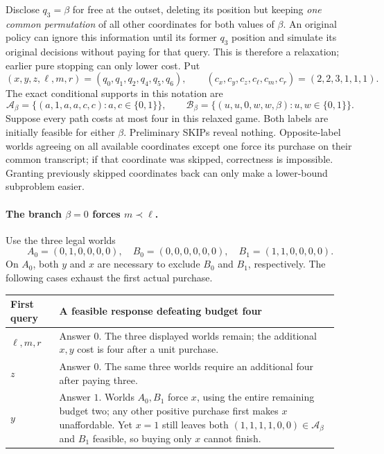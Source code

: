 \documentclass[pdflatex,sn-mathphys-num]{sn-jnl}
\theoremstyle{thmstyleone}
\theoremstyle{thmstylethree}
\theoremstyle{thmstyletwo}
\begin{document}
Disclose $q_3=\beta$ for free at the outset, deleting its position but
keeping \emph{one common permutation} of all other coordinates for both
values of $\beta$. An original policy can ignore this information until
its former $q_3$ position and simulate its original decisions without
paying for that query. This is therefore a relaxation; earlier pure
stopping can only lower cost. Put
\[
 (x,y,z,\ell,m,r)=(q_0,q_1,q_2,q_4,q_5,q_6),
 \qquad (c_x,c_y,c_z,c_\ell,c_m,c_r)=(2,2,3,1,1,1).
\]
The exact conditional supports in this notation are
\[
 \mathcal A_\beta=\{(a,1,a,a,c,c):a,c\in\{0,1\}\},\qquad
 \mathcal B_\beta=\{(u,u,0,w,w,\beta):u,w\in\{0,1\}\}.
\]
Suppose every path costs at most four in this relaxed game. Both labels
are initially feasible for either $\beta$. Preliminary SKIPs reveal
nothing. Opposite-label worlds agreeing on all available coordinates
except one force its purchase on their common transcript; if that
coordinate was skipped, correctness is impossible. Granting previously
skipped coordinates back can only make a lower-bound subproblem easier.

\paragraph*{The branch $\beta=0$ forces $m\prec\ell$.}
Use the three legal worlds
\[
 A_0=(0,1,0,0,0,0),\quad B_0=(0,0,0,0,0,0),\quad
 B_1=(1,1,0,0,0,0).
\]
On $A_0$, both $y$ and $x$ are necessary to exclude $B_0$ and $B_1$,
respectively. The following cases exhaust the first actual purchase.

\begin{center}\small
\begin{tabular}{@{}p{0.14\linewidth}p{0.80\linewidth}@{}}
\toprule
First query & A feasible response defeating budget four\\\midrule
$\ell,m,r$ & Answer $0$. The three displayed worlds remain; the
additional $x,y$ cost is four after a unit purchase.\\
$z$ & Answer $0$. The same three worlds require an additional four after
paying three.\\
$y$ & Answer $1$. Worlds $A_0,B_1$ force $x$, using the entire remaining
budget two; any other positive purchase first makes $x$ unaffordable.
Yet $x=1$ still leaves both $(1,1,1,1,0,0)\in\mathcal A_\beta$ and
$B_1$ feasible, so buying only $x$ cannot finish.\\
\bottomrule
\end{tabular}
\end{center}
\end{document}

